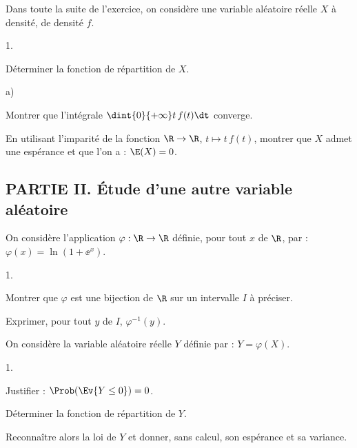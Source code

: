 \noindent
Dans toute la suite de l'exercice, on considère une variable aléatoire 
réelle $X$ à densité, de densité $f$.
\begin{noliste}{1.}
\setlength{\itemsep}{4mm}
\setcounter{enumi}{2}
\item Déterminer la fonction de répartition de $X$.




\item
\begin{noliste}{a)}
\setlength{\itemsep}{2mm}
\item Montrer que l'intégrale $\dint{0}{+\infty}t \, f(t)\dt$ 
converge.



\item En utilisant l'imparité de la fonction $\R\to \R$, $t\mapsto t
  \, f(t)$, montrer que $X$ admet une espérance et que l'on a :
  $\E(X)=0$.



\end{noliste}
\end{noliste}

\subsection*{PARTIE II. Étude d'une autre variable aléatoire}

\noindent
On considère l'application $\varphi: \R\rightarrow\R$ définie, pour
tout $x$ de $\R$, par : $\varphi(x) = \ln(1+\ee^x)$.
\begin{noliste}{1.}
  \setlength{\itemsep}{4mm}%
  \setcounter{enumi}{4}
\item Montrer que $\varphi$ est une bijection de $\R$ sur un 
  intervalle $I$ à préciser.



\item Exprimer, pour tout $y$ de $I$, $\varphi^{-1}(y)$.



\end{noliste}




\noindent
On considère la variable aléatoire réelle $Y$ définie par : 
$Y=\varphi(X)$.
\begin{noliste}{1.}
\setlength{\itemsep}{4mm}
\setcounter{enumi}{6}
\item Justifier : $\Prob(\Ev{Y\leq 0})=0$.



\item Déterminer la fonction de répartition de $Y$.




\item Reconnaître alors la loi de $Y$ et donner, sans calcul, son 
espérance et sa variance.



\end{noliste}


